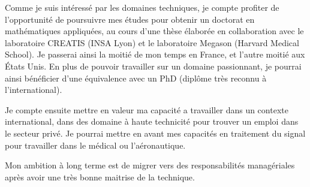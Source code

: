 Comme je suis intéressé par les domaines techniques,
je compte profiter de l'opportunité de poursuivre mes études pour obtenir un doctorat en mathématiques appliquées,
au cours d'une thèse élaborée en collaboration avec le laboratoire CREATIS (INSA Lyon)
et le laboratoire Megason (Harvard Medical School).
Je passerai ainsi la moitié de mon temps en France, et l'autre moitié aux États Unis.
En plus de pouvoir travailler sur un domaine passionnant,
je pourrai ainsi bénéficier d'une équivalence avec un PhD (diplôme très reconnu à l'international). 

Je compte ensuite mettre en valeur ma capacité a travailler dans un contexte international,
dans des domaine à haute technicité pour trouver un emploi  dans le secteur privé.
Je pourrai mettre en avant mes capacités en traitement du signal pour travailler dans le médical ou l'aéronautique.

Mon ambition à long terme est de migrer vers des responsabilités managériales après avoir une très bonne maitrise de la technique.




\appendix







